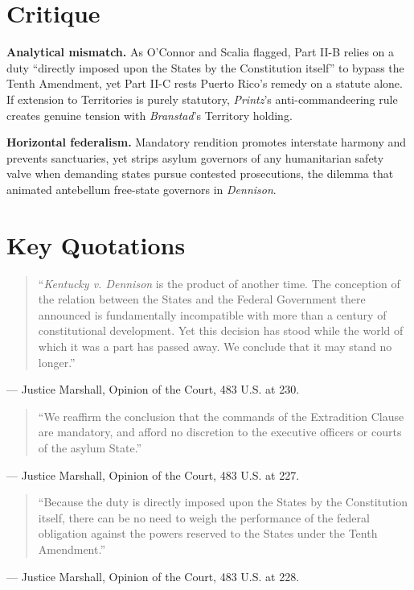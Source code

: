 \documentclass[12pt]{article}
\begin{document}
\section{Critique}

\textbf{Analytical mismatch.} As O'Connor and Scalia flagged, Part II-B relies on a duty ``directly imposed upon the States by the Constitution itself'' to bypass the Tenth Amendment, yet Part II-C rests Puerto Rico's remedy on a statute alone. If extension to Territories is purely statutory, \textit{Printz}'s anti-commandeering rule creates genuine tension with \textit{Branstad}'s Territory holding.

\textbf{Horizontal federalism.} Mandatory rendition promotes interstate harmony and prevents sanctuaries, yet strips asylum governors of any humanitarian safety valve when demanding states pursue contested prosecutions, the dilemma that animated antebellum free-state governors in \textit{Dennison}.

\section{Key Quotations}

\begin{quote}
``\emph{Kentucky v. Dennison} is the product of another time. The conception of the relation between the States and the Federal Government there announced is fundamentally incompatible with more than a century of constitutional development. Yet this decision has stood while the world of which it was a part has passed away. We conclude that it may stand no longer.''
\end{quote}
\noindent --- Justice Marshall, Opinion of the Court, 483 U.S. at 230.

\begin{quote}
``We reaffirm the conclusion that the commands of the Extradition Clause are mandatory, and afford no discretion to the executive officers or courts of the asylum State.''
\end{quote}
\noindent --- Justice Marshall, Opinion of the Court, 483 U.S. at 227.

\begin{quote}
``Because the duty is directly imposed upon the States by the Constitution itself, there can be no need to weigh the performance of the federal obligation against the powers reserved to the States under the Tenth Amendment.''
\end{quote}
\noindent --- Justice Marshall, Opinion of the Court, 483 U.S. at 228.
\end{document}
